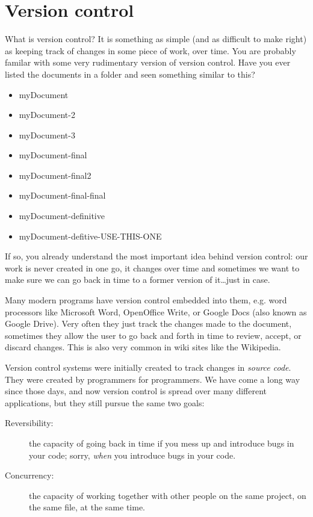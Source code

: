 
\section{Version control}
\label{sec:version-control}

What is version control? It is something as simple (and as difficult
to make right) as keeping track of changes in some piece of work, over
time. You
are probably familar with some very rudimentary version of version
control. Have you ever listed the documents in a folder and seen
something similar to this?

\begin{itemize}
\item myDocument
\item myDocument-2
\item myDocument-3
\item myDocument-final
\item myDocument-final2
\item myDocument-final-final
\item myDocument-definitive
\item myDocument-defitive-USE-THIS-ONE
\end{itemize}

If so, you already understand the most important idea behind version
control: our work is never created in one go, it changes over time and
sometimes we want to make sure we can go back in time to a former
version of it\ldots just in case. 

Many modern programs have version control embedded into them,
e.g. word processors like Microsoft Word, OpenOffice Write, or Google
Docs (also known as Google Drive). Very often they just track the
changes made to the document, sometimes they allow the user to go back
and forth in time to review, accept, or discard changes. This is also
very common in wiki sites like the Wikipedia. 


Version control systems were initially created to track changes in
\emph{source code}. They were created by programmers for
programmers. We have come a long way since those days, and now version
control is spread over many different applications, but they still
pursue the same two goals: 

\begin{description}
\item[Reversibility: ] the capacity of going back in time if you mess
  up and introduce bugs in your code; sorry, \emph{when} you introduce
  bugs in your code.
\item[Concurrency: ] the capacity of working together with other
  people on the same project, on the same file, at the same time. 
\end{description}

